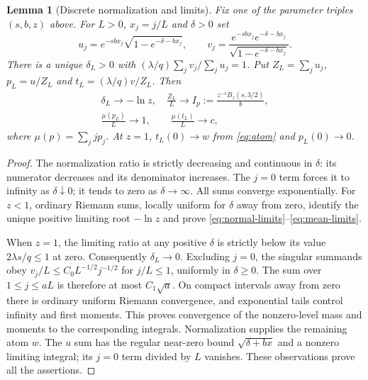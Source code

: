 \documentclass[11pt]{article}
\newtheorem{lemma}[theorem]{Lemma}
\begin{document}
\begin{lemma}[Discrete normalization and limits]\label{lem:discrete}
Fix one of the parameter triples $(s,b,z)$ above. For $L>0$, $x_j=j/L$ and $\delta>0$ set
\[
 u_j=e^{-sbx_j}\sqrt{1-e^{-\delta-bx_j}},\qquad
 v_j=\frac{e^{-sbx_j}e^{-\delta-bx_j}}{\sqrt{1-e^{-\delta-bx_j}}}.
\]
There is a unique $\delta_L>0$ with $(\lambda/q)\sum_jv_j/\sum_ju_j=1$. Put $Z_L=\sum_ju_j$, $p_L=u/Z_L$ and $t_L=(\lambda/q)v/Z_L$. Then
\begin{gather}
 \delta_L\to-\ln z,\quad
 \frac{Z_L}{L}\to I_p:=\frac{z^{-s}B_z(s,3/2)}b,\label{eq:normal-limits}\\
 \frac{\mu(p_L)}L\to1,\qquad\frac{\mu(t_L)}L\to c,\label{eq:mean-limits}
\end{gather}
where $\mu(p)=\sum_jjp_j$. At $z=1$, $t_L(0)\to w$ from \eqref{eq:atom} and $p_L(0)\to0$.
\end{lemma}
\begin{proof}
The normalization ratio is strictly decreasing and continuous in $\delta$: its numerator decreases and its denominator increases. The $j=0$ term forces it to infinity as $\delta\downarrow0$; it tends to zero as $\delta\to\infty$. All sums converge exponentially. For $z<1$, ordinary Riemann sums, locally uniform for $\delta$ away from zero, identify the unique positive limiting root $-\ln z$ and prove \eqref{eq:normal-limits}--\eqref{eq:mean-limits}.

When $z=1$, the limiting ratio at any positive $\delta$ is strictly below its value $2\lambda s/q\le1$ at zero. Consequently $\delta_L\to0$. Excluding $j=0$, the singular summands obey $v_j/L\le C_0L^{-1/2}j^{-1/2}$ for $j/L\le1$, uniformly in $\delta\ge0$. The sum over $1\le j\le aL$ is therefore at most $C_1\sqrt a$. On compact intervals away from zero there is ordinary uniform Riemann convergence, and exponential tails control infinity and first moments. This proves convergence of the nonzero-level mass and moments to the corresponding integrals. Normalization supplies the remaining atom $w$. The $u$ sum has the regular near-zero bound $\sqrt{\delta+bx}$ and a nonzero limiting integral; its $j=0$ term divided by $L$ vanishes. These observations prove all the assertions.
\end{proof}
\end{document}
